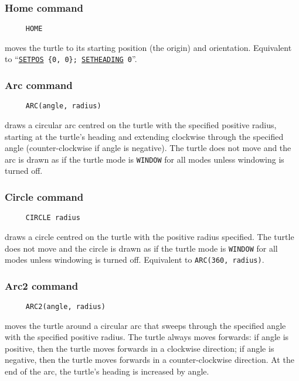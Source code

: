 \subsubsection*{Home command}
\begin{verbatim}
     HOME
\end{verbatim}
\label{logoturtle:home}
moves the turtle to its starting position (the origin) and orientation.
Equivalent to ``\texttt{\hyperref[logoturtle:setpos]{SETPOS}~\{0,~0\};
  \hyperref[logoturtle:setheading]{SETHEADING}~0}''.

\subsubsection*{Arc command}
\begin{verbatim}
     ARC(angle, radius)
\end{verbatim}
draws a circular arc centred on the turtle with the specified positive
radius, starting at the turtle's heading and extending clockwise
through the specified angle (counter-clockwise if angle is negative).
The turtle does not move and the arc is drawn as if the turtle mode is
\texttt{WINDOW} for all modes unless windowing is turned off.

\subsubsection*{Circle command}
\begin{verbatim}
     CIRCLE radius
\end{verbatim}
draws a circle centred on the turtle with the positive radius
specified.  The turtle does not move and the circle is drawn as if the
turtle mode is \texttt{WINDOW} for all modes unless windowing is
turned off.  Equivalent to \texttt{ARC(360, radius)}.

\subsubsection*{Arc2 command}
\begin{verbatim}
     ARC2(angle, radius)
\end{verbatim}
moves the turtle around a circular arc that sweeps through the
specified angle with the specified positive radius.  The turtle always
moves forwards: if angle is positive, then the turtle moves forwards
in a clockwise direction; if angle is negative, then the turtle moves
forwards in a counter-clockwise direction.  At the end of the arc, the
turtle's heading is increased by angle.

